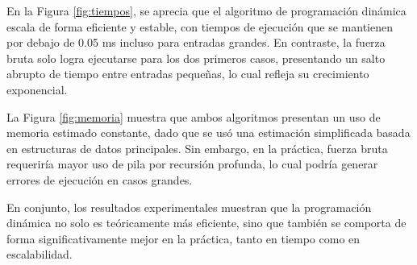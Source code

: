 En la Figura \ref{fig:tiempos}, se aprecia que el algoritmo de programación dinámica escala de forma eficiente y estable, con tiempos de ejecución que se mantienen por debajo de 0.05 ms incluso para entradas grandes. En contraste, la fuerza bruta solo logra ejecutarse para los dos primeros casos, presentando un salto abrupto de tiempo entre entradas pequeñas, lo cual refleja su crecimiento exponencial.

La Figura \ref{fig:memoria} muestra que ambos algoritmos presentan un uso de memoria estimado constante, dado que se usó una estimación simplificada basada en estructuras de datos principales. Sin embargo, en la práctica, fuerza bruta requeriría mayor uso de pila por recursión profunda, lo cual podría generar errores de ejecución en casos grandes.

En conjunto, los resultados experimentales muestran que la programación dinámica no solo es teóricamente más eficiente, sino que también se comporta de forma significativamente mejor en la práctica, tanto en tiempo como en escalabilidad.
